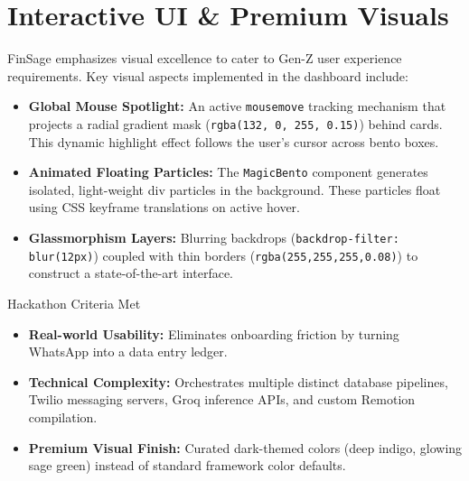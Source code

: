 \documentclass[11pt,a4paper]{article}
\begin{document}
\section{Interactive UI \& Premium Visuals}
FinSage emphasizes visual excellence to cater to Gen-Z user experience requirements. Key visual aspects implemented in the dashboard include:
\begin{itemize}
    \item \textbf{Global Mouse Spotlight:} An active \texttt{mousemove} tracking mechanism that projects a radial gradient mask (\texttt{rgba(132, 0, 255, 0.15)}) behind cards. This dynamic highlight effect follows the user's cursor across bento boxes.
    \item \textbf{Animated Floating Particles:} The \texttt{MagicBento} component generates isolated, light-weight div particles in the background. These particles float using CSS keyframe translations on active hover.
    \item \textbf{Glassmorphism Layers:} Blurring backdrops (\texttt{backdrop-filter: blur(12px)}) coupled with thin borders (\texttt{rgba(255,255,255,0.08)}) to construct a state-of-the-art interface.
\end{itemize}

\begin{highlightbox}{Hackathon Criteria Met}
    \begin{itemize}[leftmargin=*]
        \item \textbf{Real-world Usability:} Eliminates onboarding friction by turning WhatsApp into a data entry ledger.
        \item \textbf{Technical Complexity:} Orchestrates multiple distinct database pipelines, Twilio messaging servers, Groq inference APIs, and custom Remotion compilation.
        \item \textbf{Premium Visual Finish:} Curated dark-themed colors (deep indigo, glowing sage green) instead of standard framework color defaults.
    \end{itemize}
\end{highlightbox}

\end{document}
